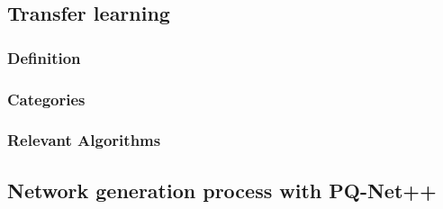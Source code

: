\subsection{Transfer learning}
\subsubsection{Definition}
\subsubsection{Categories}
\subsubsection{Relevant Algorithms}
\subsection{Network generation process with PQ-Net++}

